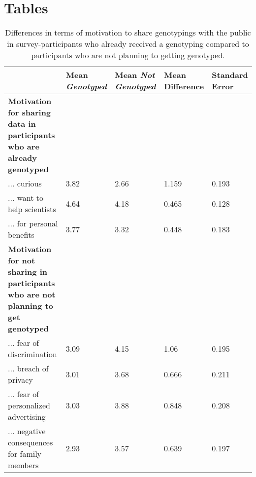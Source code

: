 \documentclass[10pt]{article}
\begin{document}


\section*{Tables}
\begin{table}
\caption{Differences in terms of motivation to share genotypings with the public in survey-participants who already received a genotyping compared to participants who are not planning to getting genotyped. }  
\begin{tabular}{|p{7cm}|p{2cm}|p{2cm}|p{2cm}|p{2cm}|}
\hline
& Mean \emph{Genotyped} & Mean \emph{Not Genotyped} & Mean Difference & Standard Error\\ 
\hline
\textbf{Motivation for sharing data in participants who are already genotyped} & & & & \\
\hline 
... curious & 3.82 & 2.66 & 1.159 & 0.193 \\ \hline %
... want to help scientists & 4.64 & 4.18  & 0.465 & 0.128 \\ \hline %
... for personal benefits & 3.77 & 3.32  & 0.448 & 0.183 \\ \hline %
\textbf{Motivation for not sharing in participants who are not planning to get genotyped} & & & & \\ \hline
... fear of discrimination & 3.09 & 4.15  & 1.06 & 0.195 \\ \hline %
... breach of privacy & 3.01 & 3.68  & 0.666 & 0.211 \\ \hline %
... fear of personalized advertising & 3.03 & 3.88  & 0.848 & 0.208 \\ \hline %
... negative consequences for family members & 2.93 & 3.57  & 0.639 & 0.197 \\ \hline 
\end{tabular}
\label{tab:motivations1}
\end{table}
\end{document}
